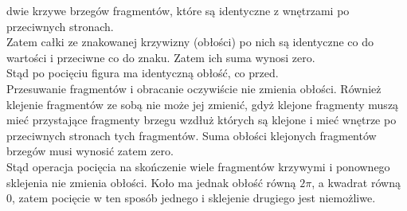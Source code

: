 \documentclass[a4paper, 12pt, twosided]{article}
\begin{document}
 dwie 
krzywe
brzegów fragmentów, które są identyczne z wnętrzami po przeciwnych stronach. \\
Zatem całki ze znakowanej krzywizny (obłości) po nich są identyczne co do wartości i przeciwne co 
 do 
znaku.
Zatem ich suma wynosi zero. \\
Stąd po pocięciu figura ma identyczną obłość, co przed. \\
Przesuwanie fragmentów i obracanie oczywiście nie zmienia obłości. Również klejenie fragmentów ze 
sobą nie
może jej zmienić, gdyż klejone fragmenty muszą mieć przystające fragmenty brzegu wzdłuż których są 
klejone i mieć wnętrze po przeciwnych 
stronach tych fragmentów. Suma
obłości klejonych fragmentów brzegów musi wynosić zatem zero. \\
Stąd operacja pocięcia na skończenie wiele fragmentów krzywymi i ponownego sklejenia nie zmienia 
obłości.
Koło ma jednak obłość równą $2\pi$, a kwadrat równą $0$, zatem pocięcie w ten sposób jednego i 
sklejenie
drugiego jest niemożliwe.
\end{document}
